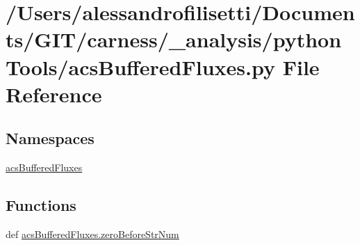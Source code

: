 \hypertarget{a00041}{\section{/\-Users/alessandrofilisetti/\-Documents/\-G\-I\-T/carness/\-\_\-analysis/python\-Tools/acs\-Buffered\-Fluxes.py File Reference}
\label{a00041}
}
\subsection*{Namespaces}
\begin{DoxyCompactItemize}
\item 
\hyperlink{a00124}{acs\-Buffered\-Fluxes}
\end{DoxyCompactItemize}
\subsection*{Functions}
\begin{DoxyCompactItemize}
\item 
def \hyperlink{a00124_ad40fd27cb36a2086a2b8d0acadd4dbc9}{acs\-Buffered\-Fluxes.\-zero\-Before\-Str\-Num}
\end{DoxyCompactItemize}

